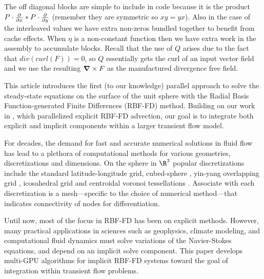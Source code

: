 The off diagonal blocks are simple to include in code because it is the product $P\cdot \frac{\partial }{\partial x} * P \cdot \frac{\partial }{\partial y}$ (remember they are symmetric so $xy = yx$). Also in the case of the interleaved values we have extra non-zeros bundled together to benefit from cache effects. When $\eta$ is a non-constant function then we have extra work in the assembly to accumulate blocks. Recall that the use of $Q$ arises due to the fact that $div(curl(F)) = 0$, so $Q$ essentially gets the curl of an input vector field and we use the resulting $\mbox{\boldmath$ \nabla $} \times F$ as the manufactured divergence free field. 



This article introduces the first (to our knowledge) parallel approach to solve the steady-state equations on the surface of the unit sphere with the Radial Basis Function-generated Finite Differences (RBF-FD) method. Building on our work in \cite{bolligFlyerErlebacher2011}, which parallelized explicit RBF-FD advection, our goal is to integrate both explicit and implicit components within a larger transient flow model. 


For decades, the demand for fast and accurate numerical solutions in fluid flow has lead to a plethora of computational methods for various geometries, discretizations and dimensions.  On the sphere in $\R^3$ popular discretizations include the standard latitude-longitude grid, cubed-sphere \cite{NairTransport05}, yin-yang overlapping grid \cite{Kameyama2008a}, icosahedral grid \cite{Randall2002} and centroidal voronoi tessellations \cite{Du2006}. Associate with each discretization is a mesh---specific to the choice of numerical method---that indicates connectivity of nodes for differentiation.


Until now, most of the focus in RBF-FD has been on explicit methods. However, many practical applications in sciences such as geophysics, climate modeling, and computational fluid dynamics must solve variations of the Navier-Stokes equations, and depend on an implicit solve component. This paper develops multi-GPU algorithms for implicit RBF-FD systems toward the goal of integration within transient flow problems. %


